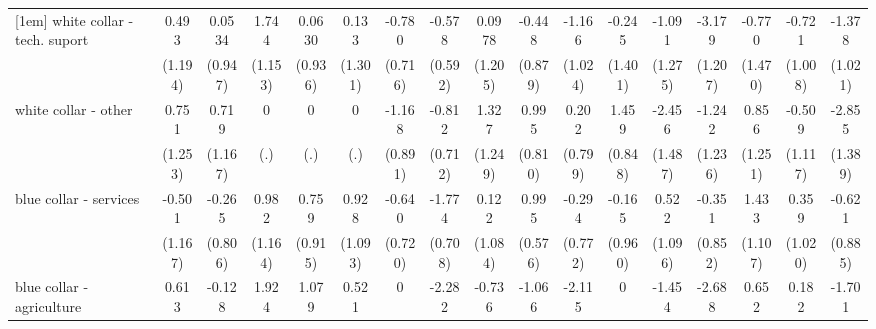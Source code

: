 {\begin{tabular}{l*{16}{c}}
[1em]
white collar - tech. suport&       0.493         &      0.0534         &       1.744         &      0.0630         &       0.133         &      -0.780         &      -0.578         &      0.0978         &      -0.448         &      -1.166         &      -0.245         &      -1.091         &      -3.179\sym{**} &      -0.770         &      -0.721         &      -1.378         \\
                    &     (1.194)         &     (0.947)         &     (1.153)         &     (0.936)         &     (1.301)         &     (0.716)         &     (0.592)         &     (1.205)         &     (0.879)         &     (1.024)         &     (1.401)         &     (1.275)         &     (1.207)         &     (1.470)         &     (1.008)         &     (1.021)         \\
[1em]
white collar - other&       0.751         &       0.719         &           0         &           0         &           0         &      -1.168         &      -0.812         &       1.327         &       0.995         &       0.202         &       1.459         &      -2.456         &      -1.242         &       0.856         &      -0.509         &      -2.855\sym{*}  \\
                    &     (1.253)         &     (1.167)         &         (.)         &         (.)         &         (.)         &     (0.891)         &     (0.712)         &     (1.249)         &     (0.810)         &     (0.799)         &     (0.848)         &     (1.487)         &     (1.236)         &     (1.251)         &     (1.117)         &     (1.389)         \\
[1em]
blue collar - services&      -0.501         &      -0.265         &       0.982         &       0.759         &       0.928         &      -0.640         &      -1.774\sym{*}  &       0.122         &       0.995         &      -0.294         &      -0.165         &       0.522         &      -0.351         &       1.433         &       0.359         &      -0.621         \\
                    &     (1.167)         &     (0.806)         &     (1.164)         &     (0.915)         &     (1.093)         &     (0.720)         &     (0.708)         &     (1.084)         &     (0.576)         &     (0.772)         &     (0.960)         &     (1.096)         &     (0.852)         &     (1.107)         &     (1.020)         &     (0.885)         \\
[1em]
blue collar - agriculture&       0.613         &      -0.128         &       1.924         &       1.079         &       0.521         &           0         &      -2.282\sym{*}  &      -0.736         &      -1.066         &      -2.115         &           0         &      -1.454         &      -2.688\sym{*}  &       0.652         &       0.182         &      -1.701         \\

\end{tabular}}

